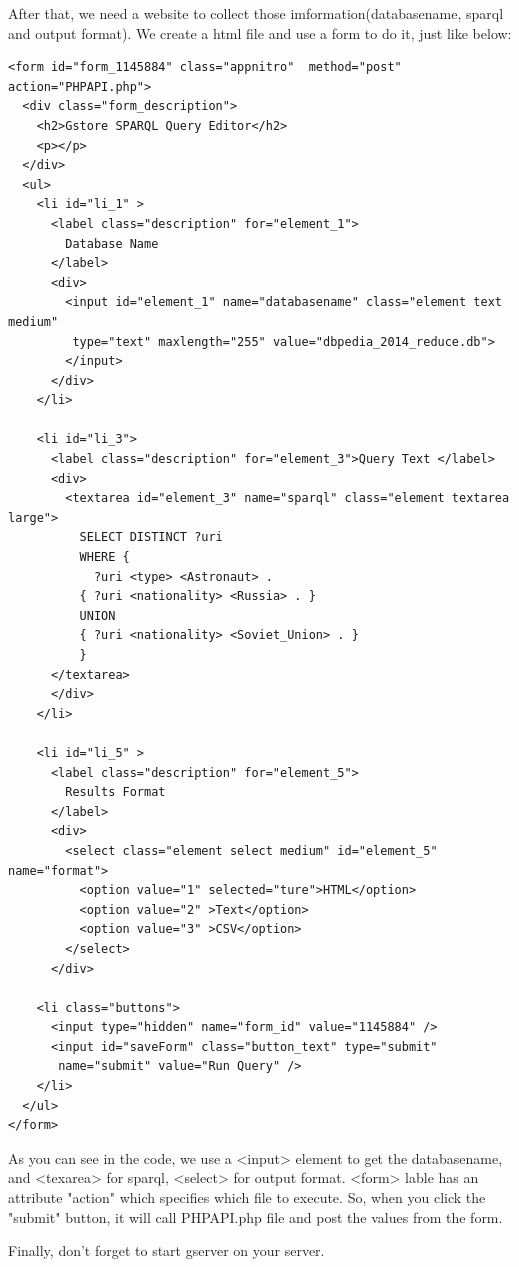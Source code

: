 \documentclass[titlepage, a4paper, 12pt]{article}
\begin{document}
	After that, we need a website to collect those imformation(databasename, sparql and output format). We create a html file and use a form to do it, just like below:
	\begin{verbatim}
<form id="form_1145884" class="appnitro"  method="post" action="PHPAPI.php">
  <div class="form_description">
    <h2>Gstore SPARQL Query Editor</h2>
    <p></p>
  </div>						
  <ul>
    <li id="li_1" >
      <label class="description" for="element_1">
        Database Name 
      </label>
      <div>
        <input id="element_1" name="databasename" class="element text medium" 
         type="text" maxlength="255" value="dbpedia_2014_reduce.db">
        </input>
      </div> 
    </li>		

    <li id="li_3">
      <label class="description" for="element_3">Query Text </label>
      <div>
        <textarea id="element_3" name="sparql" class="element textarea large">
          SELECT DISTINCT ?uri 
          WHERE { 
            ?uri <type> <Astronaut> . 
          { ?uri <nationality> <Russia> . } 
          UNION 
          { ?uri <nationality> <Soviet_Union> . } 
          } 
      </textarea> 
      </div> 
    </li>		

    <li id="li_5" >
      <label class="description" for="element_5">
        Results Format 
      </label>
      <div>
        <select class="element select medium" id="element_5" name="format"> 
          <option value="1" selected="ture">HTML</option>
          <option value="2" >Text</option>
          <option value="3" >CSV</option>
        </select>
      </div> 

    <li class="buttons">
      <input type="hidden" name="form_id" value="1145884" />
      <input id="saveForm" class="button_text" type="submit" 
       name="submit" value="Run Query" />
    </li>
  </ul>
</form>
	\end{verbatim}
	
	As you can see in the code, we use a <input> element to get the databasename, and <texarea> for sparql, <select> for output format. <form> lable has an attribute "action" which specifies which file to execute. So, when you click the "submit" button, it will call PHPAPI.php file and post the values from the form. 

	Finally, don't forget to start gserver on your server.
	
	\clearpage


\end{document}
